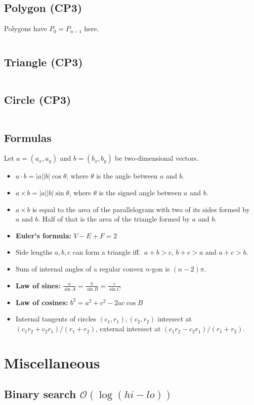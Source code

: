 \documentclass[9pt,a4paper,landscape,oneside]{amsart}
\newcommand{\mintedstyle}[2]{\inputminted{#1}{code/#2}}
\newcommand{\code}[1]{\mintedstyle{cpp}{#1}}
\newenvironment{myitemize}
{\begin{itemize}[leftmargin=.3cm]
	\setlength{\itemsep}{0pt}
	\setlength{\parskip}{0pt}
	\setlength{\parsep}{0pt}     }
{ \end{itemize}                  }
\begin{document}
\begin{multicols*}{3}
\subsection{Polygon (CP3)}
Polygons have $P_0 = P_{n-1}$ here.
\code{geometry/CP/polygon.cpp}
\subsection{Triangle (CP3)}
\code{geometry/CP/triangles.cpp}
\subsection{Circle (CP3)}
\code{geometry/CP/circles.cpp}

\subsection{Formulas}
Let $a = (a_x, a_y)$ and $b = (b_x, b_y)$ be two-dimensional vectors.
\begin{myitemize}
	\item $a\cdot b = |a||b|\cos{\theta}$, where $\theta$ is the angle
		between $a$ and $b$.
	\item $a\times b = |a||b|\sin{\theta}$, where $\theta$ is the
		signed angle between $a$ and $b$.
	\item $a\times b$ is equal to the area of the parallelogram with
		two of its sides formed by $a$ and $b$. Half of that is the
		area of the triangle formed by $a$ and $b$.
	\item \textbf{Euler's formula:} $V - E + F = 2$
	\item Side lengths $a,b,c$ can form a triangle iff.\ $a+b>c$, $b+c>a$ and $a+c>b$.
	\item Sum of internal angles of a regular convex $n$-gon is $(n-2)\pi$.
	\item \textbf{Law of sines:} $\frac{a}{\sin A} = \frac{b}{\sin B} = \frac{c}{\sin C}$
	\item \textbf{Law of cosines:} $b^2 = a^2 + c^2 - 2ac\cos B$
	\item Internal tangents of circles $(c_1,r_1), (c_2,r_2)$ intersect at $(c_1r_2+c_2r_1)/(r_1+r_2)$, external intersect at $(c_1r_2-c_2r_1)/(r_1+r_2)$.
\end{myitemize}

\section{Miscellaneous}
\subsection{Binary search $\mathcal{O}(\log (hi - lo))$}
\code{binary_search.cpp}


\end{multicols*}
\end{document}
